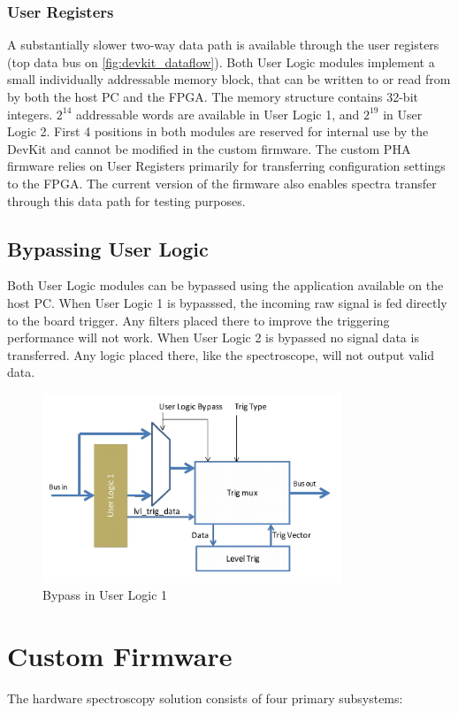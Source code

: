 \documentclass[12pt]{article}
\begin{document}
		\subsubsection{User Registers}
		A substantially slower two-way data path is available through the user registers 
		(top data bus on \autoref{fig:devkit_dataflow}). 
		Both User Logic modules implement a small individually addressable memory block, 
		that can be written to or read from by both the host PC and the FPGA. 
		The memory structure contains 32-bit integers. $2^{14}$ addressable words
		are available in User Logic 1, and $2^{19}$ in User Logic 2. 
		First 4 positions in both modules are reserved  for internal use by the DevKit 
		and cannot be modified in the custom firmware. The custom PHA firmware
		relies on User Registers primarily for transferring configuration settings to the FPGA.
		The current version of the firmware also enables spectra transfer 
		through this data path for testing purposes.
	\subsection{Bypassing User Logic}
		Both User Logic modules can be bypassed using the application available on the host PC. 
		When User Logic 1 is bypasssed, the incoming raw signal is fed directly to the board 
		trigger. Any filters placed there to improve the triggering performance will not work.
		When User Logic 2 is bypassed no signal data is transferred.
		Any logic placed there, like the spectroscope, will not output valid data.
		\begin{figure}[!h]
			\centering
			\includegraphics[width=0.8\textwidth]{img/user_logic_1_bypass.png}
			\caption{Bypass in User Logic 1}\label{fig:user_logic_1_bypass}
		\end{figure}
\newpage
\section{Custom Firmware}
	The hardware spectroscopy solution consists of four primary subsystems:
\end{document}
